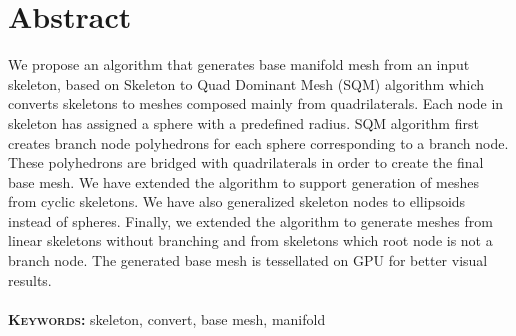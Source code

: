 \chapter{Abstract}
We propose an algorithm that generates base manifold mesh from an input skeleton, based on Skeleton to Quad Dominant Mesh (SQM) algorithm which converts skeletons to meshes composed mainly from quadrilaterals.
Each node in skeleton has assigned a sphere with a predefined radius.
SQM algorithm first creates branch node polyhedrons for each sphere corresponding to a branch node.
These polyhedrons are bridged with quadrilaterals in order to create the final base mesh.
We have extended the algorithm to support generation of meshes from cyclic skeletons.
We have also generalized skeleton nodes to ellipsoids instead of spheres.
Finally, we extended the algorithm to generate meshes from linear skeletons without branching and from skeletons which root node is not a branch node.
The generated base mesh is tessellated on GPU for better visual results.
\\ \\
\textbf{\textsc{Keywords:}} skeleton, convert, base mesh, manifold
